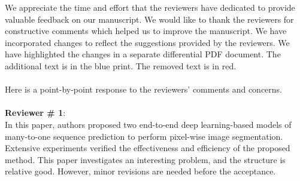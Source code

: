 \documentclass[11pt,a2paper]{report}
\begin{document}
	
	\noindent We appreciate the time and effort that the reviewers have dedicated to provide valuable feedback on our manuscript. 
	We would like to thank the reviewers for constructive comments which helped us to improve the manuscript. 
	We have incorporated changes to reflect the suggestions provided by the reviewers. 
	We have highlighted the changes in a separate differential PDF document. The additional text is in the blue print. 
	The removed text is in red. \\ \\
	Here is a point-by-point response to the reviewers’ comments and concerns.
	\\ \\
	\textbf{Reviewer \# 1}: \\
	In this paper, authors proposed two end-to-end deep learning-based models 
	of many-to-one sequence prediction to perform pixel-wise image segmentation.
	Extensive experiments verified the effectiveness and efficiency of the 
	proposed method.
	This paper investigates an interesting problem, and the structure is 
	relative good. However, minor revisions are needed before the acceptance.
	
\end{document}
